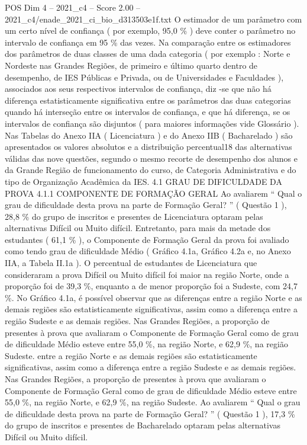 \begin{textsample}{POS Dim 4 – 2021\_c4 – Score 2.00 – 2021\_c4/enade\_2021\_ci\_bio\_d313503e1f.txt}
O estimador de um parâmetro com um certo nível de confiança ( por exemplo, 95,0 \% ) deve conter o parâmetro no intervalo de confiança em 95 \% das vezes.
Na comparação entre os estimadores dos parâmetros de duas classes de uma dada categoria ( por exemplo : Norte e Nordeste nas Grandes Regiões, de primeiro e último quarto dentro de desempenho, de IES Públicas e Privada, ou de Universidades e Faculdades ), associados aos seus respectivos intervalos de confiança, diz -se que não há diferença estatisticamente significativa entre os parâmetros das duas categorias quando há interseção entre os intervalos de confiança, e que há diferença, se os intervalos de confiança são disjuntos ( para maiores informações vide Glossário ).
Nas Tabelas do Anexo IIA ( Licenciatura ) e do Anexo IIB ( Bacharelado ) são apresentados os valores absolutos e a distribuição percentual18 das alternativas válidas das nove questões, segundo o mesmo recorte de desempenho dos alunos e da Grande Região de funcionamento do curso, de Categoria Administrativa e do tipo de Organização Acadêmica da IES. 4.1 GRAU DE DIFICULDADE DA PROVA 4.1.1 COMPONENTE DE FORMAÇÃO GERAL Ao avaliarem “ Qual o grau de dificuldade desta prova na parte de Formação Geral? ” ( Questão 1 ), 28,8 \% do grupo de inscritos e presentes de Licenciatura optaram pelas alternativas Difícil ou Muito difícil.
Entretanto, para mais da metade dos estudantes ( 61,1 \% ), o Componente de Formação Geral da prova foi avaliado como tendo grau de dificuldade Médio ( Gráfico 4.1a, Gráfico 4.2a e, no Anexo IIA, a Tabela II.1a ).
O percentual de estudantes de Licenciatura que consideraram a prova Difícil ou Muito difícil foi maior na região Norte, onde a proporção foi de 39,3 \%, enquanto a de menor proporção foi a Sudeste, com 24,7 \%.
No Gráfico 4.1a, é possível observar que as diferenças entre a região Norte e as demais regiões são estatisticamente significativas, assim como a diferença entre a região Sudeste e as demais regiões.
Nas Grandes Regiões, a proporção de presentes à prova que avaliaram o Componente de Formação Geral como de grau de dificuldade Médio esteve entre 55,0 \%, na região Norte, e 62,9 \%, na região Sudeste. entre a região Norte e as demais regiões são estatisticamente significativas, assim como a diferença entre a região Sudeste e as demais regiões.
Nas Grandes Regiões, a proporção de presentes à prova que avaliaram o Componente de Formação Geral como de grau de dificuldade Médio esteve entre 55,0 \%, na região Norte, e 62,9 \%, na região Sudeste.
Ao avaliarem “ Qual o grau de dificuldade desta prova na parte de Formação Geral? ” ( Questão 1 ), 17,3 \% do grupo de inscritos e presentes de Bacharelado optaram pelas alternativas Difícil ou Muito difícil.

\end{textsample}
